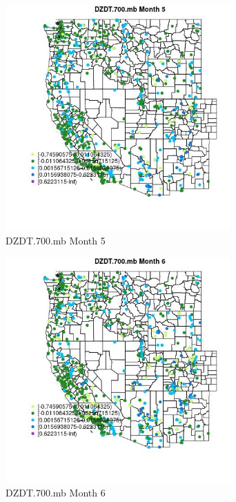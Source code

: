 \begin{figure} 
\centering  
\includegraphics[width=0.77\textwidth]{Code_Outputs/Report_ML_input_PM25_Step4_part_e_de_duplicated_aves_compiled_2019-05-21wNAs_MapObsMo5DZDT700mb.jpg} 
\caption{\label{fig:Report_ML_input_PM25_Step4_part_e_de_duplicated_aves_compiled_2019-05-21wNAsMapObsMo5DZDT700mb}DZDT.700.mb Month 5} 
\end{figure} 
 

\begin{figure} 
\centering  
\includegraphics[width=0.77\textwidth]{Code_Outputs/Report_ML_input_PM25_Step4_part_e_de_duplicated_aves_compiled_2019-05-21wNAs_MapObsMo6DZDT700mb.jpg} 
\caption{\label{fig:Report_ML_input_PM25_Step4_part_e_de_duplicated_aves_compiled_2019-05-21wNAsMapObsMo6DZDT700mb}DZDT.700.mb Month 6} 
\end{figure} 
 

